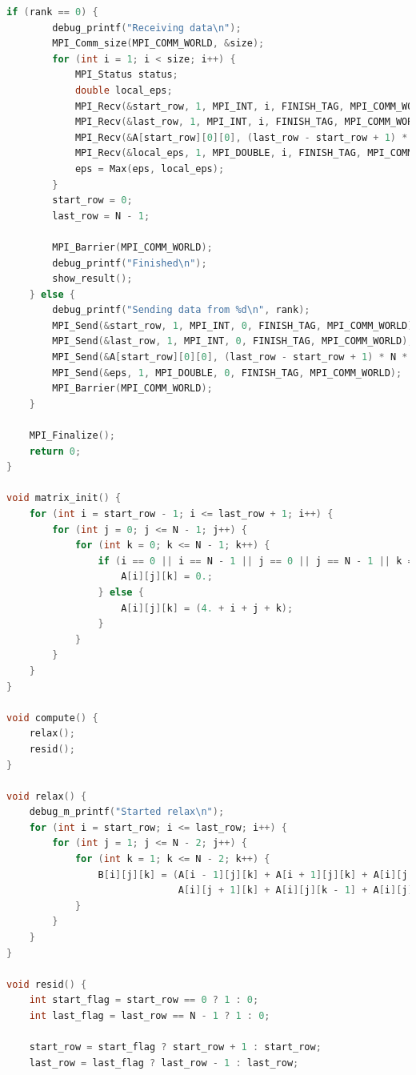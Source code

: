 \documentclass[a4paper]{article}
\begin{document}
\begin{lstlisting}[caption=jac\_3d\_mpi\_noft.c, label={lst:3}, language=C]
    if (rank == 0) {
        debug_printf("Receiving data\n");
        MPI_Comm_size(MPI_COMM_WORLD, &size);
        for (int i = 1; i < size; i++) {
            MPI_Status status;
            double local_eps;
            MPI_Recv(&start_row, 1, MPI_INT, i, FINISH_TAG, MPI_COMM_WORLD, &status);
            MPI_Recv(&last_row, 1, MPI_INT, i, FINISH_TAG, MPI_COMM_WORLD, &status);
            MPI_Recv(&A[start_row][0][0], (last_row - start_row + 1) * N * N, MPI_DOUBLE, i, FINISH_TAG, MPI_COMM_WORLD, &status);
            MPI_Recv(&local_eps, 1, MPI_DOUBLE, i, FINISH_TAG, MPI_COMM_WORLD, &status);
            eps = Max(eps, local_eps);
        }
        start_row = 0;
        last_row = N - 1;

        MPI_Barrier(MPI_COMM_WORLD);
        debug_printf("Finished\n");
        show_result();
    } else {
        debug_printf("Sending data from %d\n", rank);
        MPI_Send(&start_row, 1, MPI_INT, 0, FINISH_TAG, MPI_COMM_WORLD);
        MPI_Send(&last_row, 1, MPI_INT, 0, FINISH_TAG, MPI_COMM_WORLD);
        MPI_Send(&A[start_row][0][0], (last_row - start_row + 1) * N * N, MPI_DOUBLE, 0, FINISH_TAG, MPI_COMM_WORLD);
        MPI_Send(&eps, 1, MPI_DOUBLE, 0, FINISH_TAG, MPI_COMM_WORLD);
        MPI_Barrier(MPI_COMM_WORLD);
    }

    MPI_Finalize();
    return 0;
}

void matrix_init() {
    for (int i = start_row - 1; i <= last_row + 1; i++) {
        for (int j = 0; j <= N - 1; j++) {
            for (int k = 0; k <= N - 1; k++) {
                if (i == 0 || i == N - 1 || j == 0 || j == N - 1 || k == 0 || k == N - 1) {
                    A[i][j][k] = 0.;
                } else {
                    A[i][j][k] = (4. + i + j + k);
                }
            }
        }
    }
}

void compute() {
    relax();
    resid();
}

void relax() {
    debug_m_printf("Started relax\n");
    for (int i = start_row; i <= last_row; i++) {
        for (int j = 1; j <= N - 2; j++) {
            for (int k = 1; k <= N - 2; k++) {
                B[i][j][k] = (A[i - 1][j][k] + A[i + 1][j][k] + A[i][j - 1][k] +
                              A[i][j + 1][k] + A[i][j][k - 1] + A[i][j][k + 1]) / 6.;
            }
        }
    }
}

void resid() {
    int start_flag = start_row == 0 ? 1 : 0;
    int last_flag = last_row == N - 1 ? 1 : 0;

    start_row = start_flag ? start_row + 1 : start_row;
    last_row = last_flag ? last_row - 1 : last_row;


\end{lstlisting}
\end{document}
